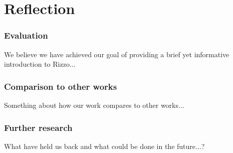 

\section{Reflection}\label{reflection}


\subsubsection{Evaluation}

We believe we have achieved our goal of providing a brief yet informative
introduction to Rizzo...

\subsubsection{Comparison to other works}

Something about how our work compares to other works...

\subsubsection{Further research}

What have held us back and what could be done in the future...?
